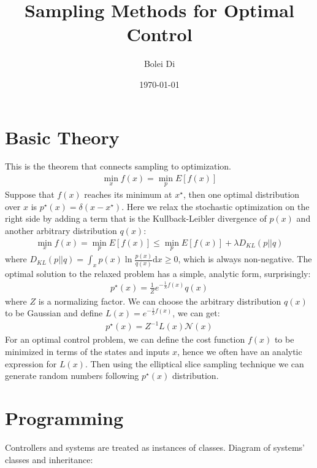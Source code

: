 \documentclass[11pt]{article}
\begin{document}
\title{\bf Sampling Methods for Optimal Control}
\date{\today}
\author{Bolei Di}
\maketitle
\begin{abstract}

\end{abstract}

\section{Basic Theory}\label{sec:intro}
This is the theorem that connects sampling to optimization.
\begin{gather*}
\min_x f(x) = \min_p E[f(x)]
\end{gather*}
Suppose that $f(x)$ reaches its minimum at $x^{\star}$, then one optimal distribution over $x$ is $p^{\star}(x)=\delta(x-x^{\star})$. 
Here we relax the stochastic optimization on the right side by adding a term that is the Kullback-Leibler divergence of $p(x)$ and another arbitrary distribution $q(x)$:
\begin{gather*}
\min_x f(x) = \min_p E[f(x)] \leq \min_p E[f(x)] + \lambda D_{KL}(p||q)
\end{gather*}
where $D_{KL}(p||q)=\int_x p(x) \ln \frac{p(x)}{q(x)} \text{d}x \geq 0$, which is always non-negative. 
The optimal solution to the relaxed problem has a simple, analytic form, surprisingly:
\begin{gather*}
p^{\star}(x) = \frac{1}{Z} e^{-\frac{1}{\lambda}f(x)} q(x)
\end{gather*}
where $Z$ is a normalizing factor. 
We can choose the arbitrary distribution $q(x)$ to be Gaussian and define $L(x)=e^{-\frac{1}{\lambda}f(x)}$, we can get:
\begin{gather*}
p^{\star}(x) = Z^{-1} L(x) \mathcal{N}(x)
\end{gather*}
For an optimal control problem, we can define the cost function $f(x)$ to be minimized in terms of the states and inputs $x$, hence we often have an analytic expression for $L(x)$. Then using the elliptical slice sampling technique we can generate random numbers following $p^{\star}(x)$ distribution. 

\section{Programming}
Controllers and systems are treated as instances of classes. Diagram of systems' classes and inheritance: \\
\end{document}
